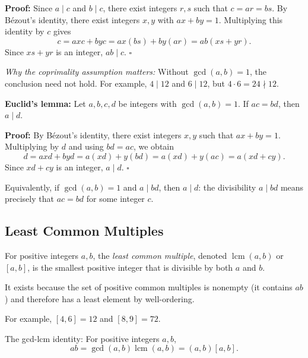 \documentclass[a4paper,11pt,abstracton]{scrartcl}
\theoremstyle{dotlessP}
\theoremstyle{dotlessS}
\theoremstyle{remark}
\theoremstyle{definition}
\begin{document}
\textbf{Proof:}
Since $a\mid c$ and $b\mid c$, there exist integers $r,s$ such that
$c=ar=bs$. By B\'ezout's identity, there exist integers $x,y$ with
$ax+by=1$. Multiplying this identity by $c$ gives
\[
    c=axc+byc=ax(bs)+by(ar)=ab(xs+yr).
\]
Since $xs+yr$ is an integer, $ab\mid c$.
\hfill$\square$



\begin{example_box}
\textit{Why the coprimality assumption matters:}
Without $\gcd(a,b)=1$, the conclusion need not hold. For example,
$4\mid12$ and $6\mid12$, but $4\cdot6=24\nmid12$.
\end{example_box}


\begin{remark_box}
\textbf{Euclid's lemma:}
Let $a,b,c,d$ be integers with $\gcd(a,b)=1$. If $ac=bd$, then
$a\mid d$.
\end{remark_box}

\textbf{Proof:}
By B\'ezout's identity, there exist integers $x,y$ such that
$ax+by=1$. Multiplying by $d$ and using $bd=ac$, we obtain
\[
    d=axd+byd=a(xd)+y(bd)=a(xd)+y(ac)=a(xd+cy).
\]
Since $xd+cy$ is an integer, $a\mid d$.
\hfill$\square$


Equivalently, if $\gcd(a,b)=1$ and $a\mid bd$, then $a\mid d$:
the divisibility $a\mid bd$ means precisely that $ac=bd$ for some
integer $c$.

\subsection{Least Common Multiples}

\begin{definition_box}
For positive integers $a,b$, the \emph{least common multiple}, denoted
$\operatorname{lcm}(a,b)$ or $[a,b]$, is the smallest positive integer
that is divisible by both $a$ and $b$.
\end{definition_box}

It exists because the set of
positive common multiples is nonempty (it contains $ab$) and therefore
has a least element by well-ordering. 

\begin{example_box}
For example, $[4,6]=12$ and $[8,9]=72$.
\end{example_box}

\begin{mainbox}{The gcd-lcm identity:}
For positive integers $a,b$,
\[
    ab=\gcd(a,b)\operatorname{lcm}(a,b)=(a,b)[a,b].
\]
\end{mainbox}
\end{document}
